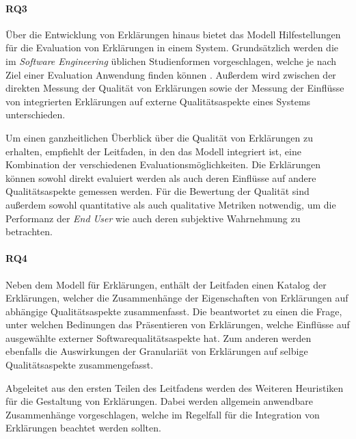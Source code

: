 \paragraph{RQ3} Über die Entwicklung von Erklärungen hinaus bietet das Modell Hilfestellungen für die Evaluation von Erklärungen in einem System. Grundsätzlich werden die im \textit{Software Engineering} üblichen Studienformen vorgeschlagen, welche je nach Ziel einer Evaluation Anwendung finden können \cite[vgl.][]{wohlin2012experimentation}. Außerdem wird zwischen der direkten Messung der Qualität von Erklärungen sowie der Messung der Einflüsse von integrierten Erklärungen auf externe Qualitätsaspekte eines Systems unterschieden.

Um einen ganzheitlichen Überblick über die Qualität von Erklärungen zu erhalten, empfiehlt der Leitfaden, in den das Modell integriert ist, eine Kombination der verschiedenen Evaluationsmöglichkeiten. Die Erklärungen können sowohl direkt evaluiert werden als auch deren Einflüsse auf andere Qualitätsaspekte gemessen werden. Für die Bewertung der Qualität sind außerdem sowohl quantitative als auch qualitative Metriken notwendig, um die Performanz der \textit{End User} wie auch deren subjektive Wahrnehmung zu betrachten.

\paragraph{RQ4} Neben dem Modell für Erklärungen, enthält der Leitfaden einen Katalog der Erklärungen, welcher die Zusammenhänge der Eigenschaften von Erklärungen auf abhängige Qualitätsaspekte zusammenfasst. Die beantwortet zu einen die Frage, unter welchen Bedinungen das Präsentieren von Erklärungen, welche Einflüsse auf ausgewählte externer Softwarequalitätsaspekte hat. Zum anderen werden ebenfalls die Auswirkungen der Granulariät von Erklärungen auf selbige Qualitätsaspekte zusammengefasst.

\bigskip

Abgeleitet aus den ersten Teilen des Leitfadens werden des Weiteren Heuristiken für die Gestaltung von Erklärungen. Dabei werden allgemein anwendbare Zusammenhänge vorgeschlagen, welche im Regelfall für die Integration von Erklärungen beachtet werden sollten.

\bigskip


